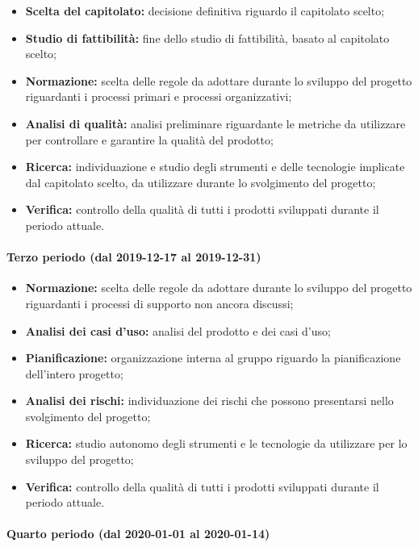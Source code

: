 				\begin{itemize}
					\item \textbf{Scelta del capitolato:} decisione definitiva riguardo il capitolato scelto;
					\item \textbf{Studio di fattibilità:} fine dello studio di fattibilità, basato al capitolato scelto;
					\item \textbf{Normazione:} scelta delle regole da adottare durante lo sviluppo del progetto riguardanti i processi primari e processi organizzativi;
					\item \textbf{Analisi di qualità:} analisi preliminare riguardante le metriche da utilizzare per controllare e garantire la qualità del prodotto;
					\item \textbf{Ricerca:} individuazione e studio degli strumenti e delle tecnologie implicate dal capitolato scelto, da utilizzare durante lo svolgimento del progetto;
					\item \textbf{Verifica:} controllo della qualità di tutti i prodotti sviluppati durante il periodo attuale.
				\end{itemize}
			
			\paragraph{Terzo periodo (dal 2019-12-17 al 2019-12-31)}
			
				\begin{itemize}
					\item \textbf{Normazione:} scelta delle regole da adottare durante lo sviluppo del progetto riguardanti i processi di supporto non ancora discussi;
					\item \textbf{Analisi dei casi d'uso:} analisi del prodotto e dei casi d'uso;
					\item \textbf{Pianificazione:} organizzazione interna al gruppo riguardo la pianificazione dell'intero progetto;
					\item \textbf{Analisi dei rischi:} individuazione dei rischi che possono presentarsi nello svolgimento del progetto;
					\item \textbf{Ricerca:} studio autonomo degli strumenti e le tecnologie da utilizzare per lo sviluppo del progetto;
					\item \textbf{Verifica:} controllo della qualità di tutti i prodotti sviluppati durante il periodo attuale.
				\end{itemize}
			
			\paragraph{Quarto periodo (dal 2020-01-01 al 2020-01-14)}
			
